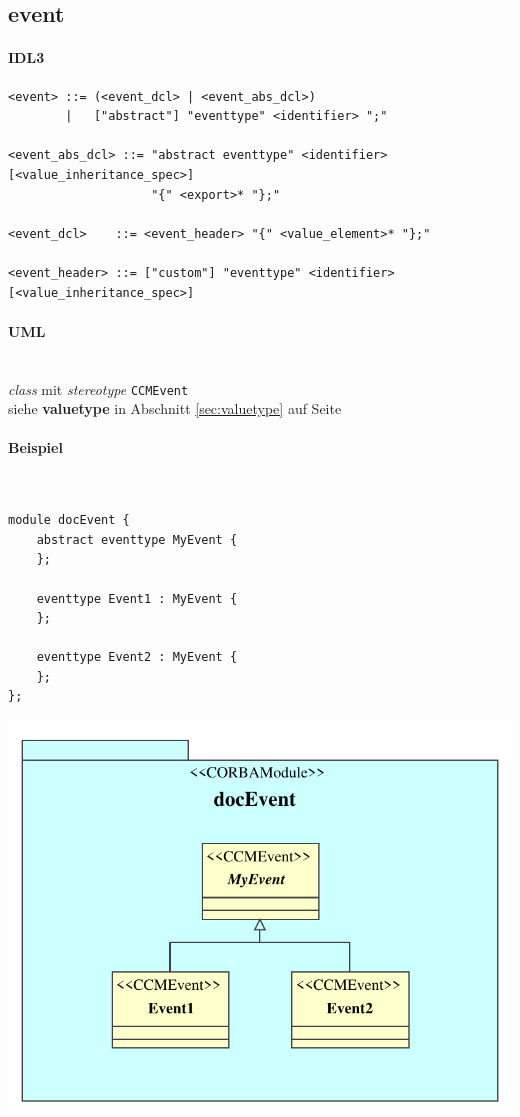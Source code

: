 \documentclass [a4paper,10pt] {scrartcl}
\begin{document}
\cleardoublepage
\subsection{event}
\paragraph{IDL3}
\begin{verbatim}
<event> ::= (<event_dcl> | <event_abs_dcl>)
        |   ["abstract"] "eventtype" <identifier> ";"

<event_abs_dcl> ::= "abstract eventtype" <identifier> [<value_inheritance_spec>]
                    "{" <export>* "};"

<event_dcl>    ::= <event_header> "{" <value_element>* "};"

<event_header> ::= ["custom"] "eventtype" <identifier> [<value_inheritance_spec>]
\end{verbatim}
\paragraph{UML}~\\
\emph{class} mit \emph{stereotype} \texttt{CCMEvent}\\
siehe \textbf{valuetype} in Abschnitt \ref{sec:valuetype} auf Seite \pageref{sec:valuetype}\\
\paragraph{Beispiel}
~\\
\begin{minipage}{0.6 \linewidth}
\begin{verbatim}
module docEvent {
    abstract eventtype MyEvent {
    };

    eventtype Event1 : MyEvent {
    };

    eventtype Event2 : MyEvent {
    };
};
\end{verbatim}
\end{minipage}
\hfill
\begin{minipage}{0.4 \linewidth}
\includegraphics[width=1.4 \linewidth]{docEvent}
\end{minipage}
\end{document}
